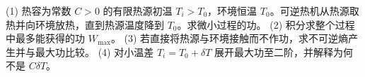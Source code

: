 (1) 热容为常数 \(C>0\) 的有限热源初温 \(T_i>T_0\)，环境恒温 \(T_0\)。可逆热机从热源取热并向环境放热，直到热源温度降到 \(T_0\)。求微小过程的功。
(2) 积分求整个过程中最多能获得的功 \(W_{\max}\)。
(3) 若直接将热源与环境接触而不作功，求不可逆熵产生并与最大功比较。
(4) 对小温差 \(T_i=T_0+\delta T\) 展开最大功至二阶，并解释为何不是 \(C\delta T\)。
